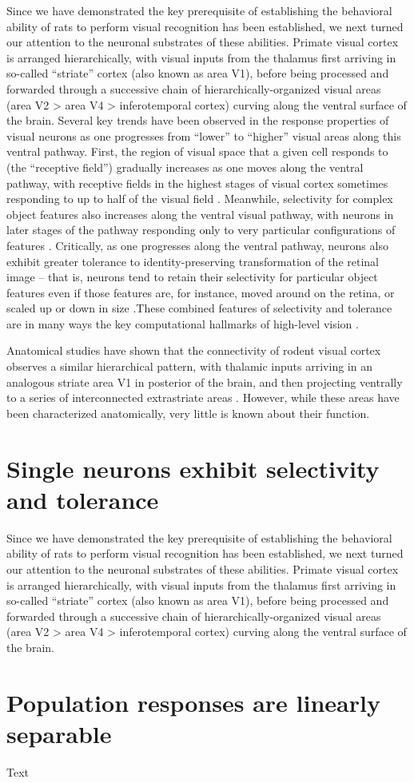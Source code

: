 Since we have demonstrated the key prerequisite of establishing the behavioral ability of rats to perform visual recognition has been established, we next turned our attention to the neuronal substrates of these abilities.  Primate visual cortex is arranged hierarchically, with visual inputs from the thalamus first arriving in so-called ``striate'' cortex (also known as area V1), before being processed and forwarded through a successive chain of hierarchically-organized visual areas (area V2 > area V4 > inferotemporal cortex) curving along the ventral surface of the brain.  
Several key trends have been observed in the response properties of visual neurons as one progresses from ``lower'' to ``higher'' visual areas along this ventral pathway. First, the region of visual space that a given cell responds to (the ``receptive field'') gradually increases as one moves along the ventral pathway, with receptive fields in the highest stages of visual cortex sometimes responding to up to half of the visual field \cite{op2000spatial}. Meanwhile, selectivity for complex object features also increases along the ventral visual pathway, with neurons in later stages of the pathway responding only to very particular configurations of features \cite{Desimone1984, Logothetis1996}.  Critically, as one progresses along the ventral pathway, neurons also exhibit greater tolerance to identity-preserving transformation of the retinal image -- that is, neurons tend to retain their selectivity for particular object features even if those features are, for instance, moved around on the retina, or scaled up or down in size \cite{Ito1995}.These combined features of selectivity and tolerance are in many ways the key computational hallmarks of high-level vision \cite{DiCarlo2007, DiCarlo2012}. 

Anatomical studies have shown that the connectivity of rodent visual cortex observes a similar hierarchical pattern, with thalamic inputs arriving in an analogous striate area V1 in posterior of the brain, and then projecting ventrally to a series of interconnected extrastriate areas  \cite{Coogan1993, ETC}.  However, while these areas have been characterized anatomically, very little is known about their function.



\section{Single neurons exhibit selectivity and tolerance}

Since we have demonstrated the key prerequisite of establishing the behavioral ability of rats to perform visual recognition has been established, we next turned our attention to the neuronal substrates of these abilities.  Primate visual cortex is arranged hierarchically, with visual inputs from the thalamus first arriving in so-called ``striate'' cortex (also known as area V1), before being processed and forwarded through a successive chain of hierarchically-organized visual areas (area V2 > area V4 > inferotemporal cortex) curving along the ventral surface of the brain.  

\section{Population responses are linearly separable}
Text

